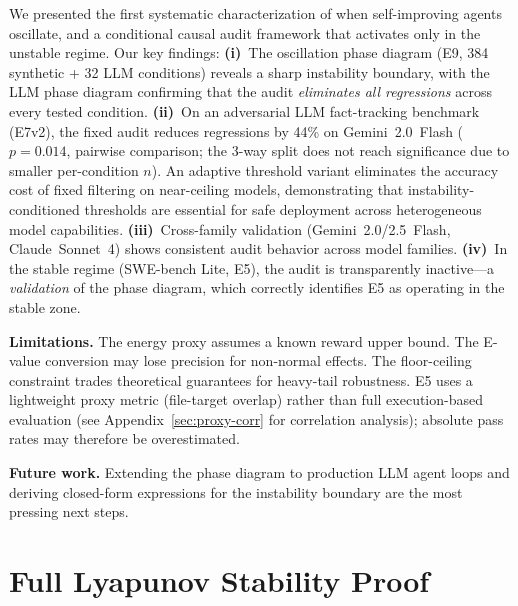 \documentclass{article}
\begin{document}

We presented the first systematic characterization of when
self-improving agents oscillate, and a conditional causal audit
framework that activates only in the unstable regime. Our key findings:
\textbf{(i)}~The oscillation phase diagram (E9, 384 synthetic + 32 LLM conditions) reveals
a sharp instability boundary, with the LLM phase diagram confirming
that the audit \emph{eliminates all regressions} across every tested condition.
\textbf{(ii)}~On an adversarial LLM fact-tracking benchmark (E7v2),
the fixed audit reduces regressions by 44\% on Gemini~2.0~Flash
($p{=}0.014$, pairwise comparison; the 3-way split does not reach significance due to smaller per-condition $n$). An adaptive threshold variant eliminates the accuracy
cost of fixed filtering on near-ceiling models, demonstrating that
instability-conditioned thresholds are essential for safe deployment
across heterogeneous model capabilities.
\textbf{(iii)}~Cross-family validation (Gemini~2.0/2.5~Flash,
Claude~Sonnet~4) shows consistent audit behavior across model
families.
\textbf{(iv)}~In the stable regime (SWE-bench Lite, E5), the audit
is transparently inactive---a \emph{validation} of the phase diagram,
which correctly identifies E5 as operating in the stable zone.

\textbf{Limitations.}
The energy proxy assumes a known reward upper bound.
The E-value conversion may lose precision for non-normal effects.
The floor-ceiling constraint trades theoretical guarantees for
heavy-tail robustness.
E5 uses a lightweight proxy metric (file-target overlap) rather
than full execution-based evaluation (see
Appendix~\ref{sec:proxy-corr} for correlation analysis);
absolute pass rates may therefore be overestimated.

\textbf{Future work.}
Extending the phase diagram to production LLM agent loops
and deriving closed-form expressions for the instability boundary
are the most pressing next steps.






\appendix

\section{Full Lyapunov Stability Proof}
\label{sec:proof}
\end{document}

